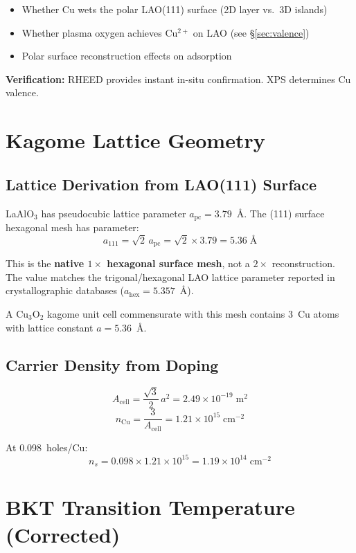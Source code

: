 \documentclass[11pt, a4paper]{article}
\begin{document}
\begin{itemize}[nosep]
  \item Whether Cu wets the polar LAO(111) surface
        (2D layer vs.\ 3D islands)
  \item Whether plasma oxygen achieves Cu$^{2+}$ on LAO
        (see \S\ref{sec:valence})
  \item Polar surface reconstruction effects on adsorption
\end{itemize}

\textbf{Verification:} RHEED provides instant in-situ
confirmation. XPS determines Cu valence.

\section{Kagome Lattice Geometry}

\subsection{Lattice Derivation from LAO(111) Surface}

LaAlO$_3$ has pseudocubic lattice parameter
$a_{\text{pc}} = 3.79$~\AA. The (111) surface hexagonal mesh
has parameter:
\[
  a_{111} = \sqrt{2}\,a_{\text{pc}}
    = \sqrt{2} \times 3.79 = 5.36\;\text{\AA}
\]

This is the \textbf{native $1\times$ hexagonal surface mesh},
not a $2\times$ reconstruction. The value matches the
trigonal/hexagonal LAO lattice parameter reported in
crystallographic databases ($a_{\text{hex}} = 5.357$~\AA).

A Cu$_3$O$_2$ kagome unit cell commensurate with this mesh
contains 3~Cu atoms with lattice constant $a = 5.36$~\AA.

\subsection{Carrier Density from Doping}

\[
  A_{\text{cell}} = \frac{\sqrt{3}}{2}\,a^2
    = 2.49 \times 10^{-19}\;\text{m}^2
\]
\[
  n_{\text{Cu}} = \frac{3}{A_{\text{cell}}}
    = 1.21 \times 10^{15}\;\text{cm}^{-2}
\]

At 0.098~holes/Cu:
\[
  n_s = 0.098 \times 1.21 \times 10^{15}
    = 1.19 \times 10^{14}\;\text{cm}^{-2}
\]

\section{BKT Transition Temperature (Corrected)}
\end{document}
